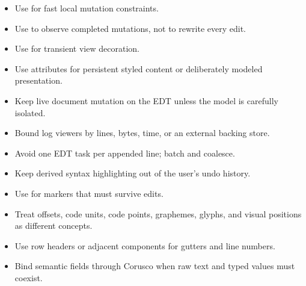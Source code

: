 \begin{itemize}
\item Use  for fast local mutation constraints.
\item Use  to observe completed mutations, not to rewrite every edit.
\item Use  for transient view decoration.
\item Use  attributes for persistent styled content or deliberately modeled presentation.
\item Keep live document mutation on the EDT unless the model is carefully isolated.
\item Bound log viewers by lines, bytes, time, or an external backing store.
\item Avoid one EDT task per appended line; batch and coalesce.
\item Keep derived syntax highlighting out of the user's undo history.
\item Use  for markers that must survive edits.
\item Treat offsets, code units, code points, graphemes, glyphs, and visual positions as different concepts.
\item Use row headers or adjacent components for gutters and line numbers.
\item Bind semantic fields through Corusco  when raw text and typed values must coexist.
\end{itemize}
